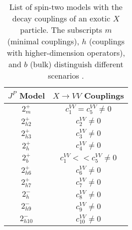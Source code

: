 \begin{table*}[htbp]
\caption[List of spin-two models with the decay couplings of an exotic $X$ particle. The subscripts $m$ (minimal couplings), $h$ (couplings with higher-dimension operators),
and $b$ (bulk) distinguish different scenarios.]{ List of spin-two models with the decay couplings of an exotic $X$ particle. The subscripts $m$ (minimal couplings), $h$ (couplings with higher-dimension operators), and $b$ (bulk) distinguish different scenarios \cite{Khachatryan:2014kca}. }
\centering
\begin{tabular}{cc}
$J^P$ Model  & $X\to VV$ Couplings \\

\hline

$2_m^+$  &   $c_{ 1}^{VV}=c_{ 5}^{VV}\ne0$     \\

$2_{h2}^+$      &   $c_{ 2}^{VV}\ne0$  \\

$2_{h3}^+$     &   $c_{ 3}^{VV}\ne0$  \\

$2_h^+$  &   $c_{ 4}^{VV}\ne0$  \\

$2_b^+$   &   $c_{ 1}^{VV} << c_{ 5}^{VV}\ne0$ \\

$2_{h6}^+$  &    $c_{ 6}^{VV}\ne0$  \\

$2_{h7}^+$ &   $c_{ 7}^{VV}\ne0$ \\

$2_h^-$  &     $c_{ 8}^{VV}\ne0$  \\

$2_{h9}^-$ &   $c_{ 9}^{VV}\ne0$ \\

$2_{h10}^-$ &  $c_{ 10}^{VV}\ne0$ \\
\end{tabular}

\label{tab:scenarios}
\end{table*}

